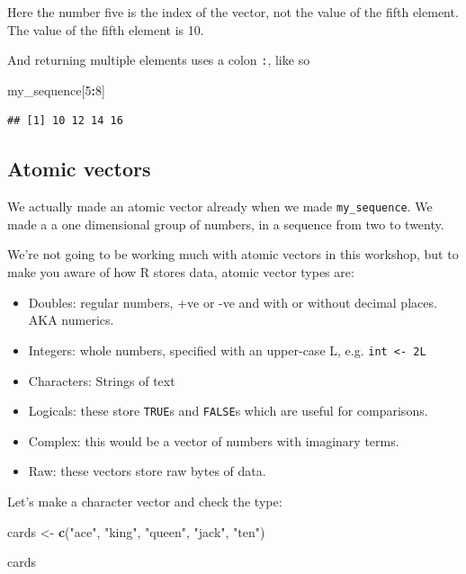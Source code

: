 \documentclass[12pt,]{book}
\newenvironment{Shaded}{\begin{snugshade}}{\end{snugshade}}
\newcommand{\KeywordTok}[1]{\textcolor[rgb]{0.13,0.29,0.53}{\textbf{#1}}}
\newcommand{\DecValTok}[1]{\textcolor[rgb]{0.00,0.00,0.81}{#1}}
\newcommand{\StringTok}[1]{\textcolor[rgb]{0.31,0.60,0.02}{#1}}
\newcommand{\OperatorTok}[1]{\textcolor[rgb]{0.81,0.36,0.00}{\textbf{#1}}}
\newcommand{\NormalTok}[1]{#1}
\providecommand{\tightlist}{%
  \setlength{\itemsep}{0pt}\setlength{\parskip}{0pt}}
\theoremstyle{definition}
\theoremstyle{definition}
\theoremstyle{definition}
\theoremstyle{remark}
\begin{document}
Here the number five is the index of the vector, not the value of the
fifth element. The value of the fifth element is 10.

And returning multiple elements uses a colon \texttt{:}, like so

\begin{Shaded}
\begin{Highlighting}[]
\NormalTok{my_sequence[}\DecValTok{5}\OperatorTok{:}\DecValTok{8}\NormalTok{]}
\end{Highlighting}
\end{Shaded}

\begin{verbatim}
## [1] 10 12 14 16
\end{verbatim}

\hypertarget{atomics}{\subsection{Atomic vectors}\label{atomics}}

We actually made an atomic vector already when we made
\texttt{my\_sequence}. We made a a one dimensional group of numbers, in
a sequence from two to twenty.

We're not going to be working much with atomic vectors in this workshop,
but to make you aware of how R stores data, atomic vector types are:

\begin{itemize}
\tightlist
\item
  Doubles: regular numbers, +ve or -ve and with or without decimal
  places. AKA numerics.
\item
  Integers: whole numbers, specified with an upper-case L, e.g.
  \texttt{int\ \textless{}-\ 2L}
\item
  Characters: Strings of text
\item
  Logicals: these store \texttt{TRUE}s and \texttt{FALSE}s which are
  useful for comparisons.
\item
  Complex: this would be a vector of numbers with imaginary terms.
\item
  Raw: these vectors store raw bytes of data.
\end{itemize}

Let's make a character vector and check the type:

\begin{Shaded}
\begin{Highlighting}[]
\NormalTok{cards <-}\StringTok{ }\KeywordTok{c}\NormalTok{(}\StringTok{"ace"}\NormalTok{, }\StringTok{"king"}\NormalTok{, }\StringTok{"queen"}\NormalTok{, }\StringTok{"jack"}\NormalTok{, }\StringTok{"ten"}\NormalTok{)}

\NormalTok{cards}
\end{Highlighting}
\end{Shaded}
\end{document}
